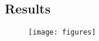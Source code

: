 \subsection{Results}
\begin{figure}
    \texttt{[image: figures]}
    \caption{}
    \label{}
\end{figure}
